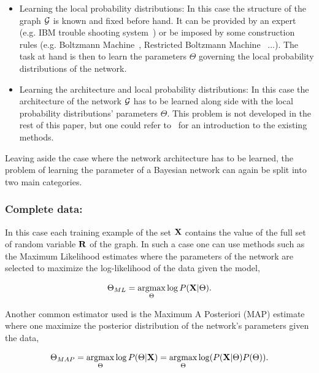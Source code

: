\documentclass[a4paper,11pt]{report}
\begin{document}
      \begin{itemize}
				\item Learning the local probability distributions: In this case the structure of the graph $\mathcal{G}$ is known and fixed before hand. It can be provided by an expert (e.g. IBM trouble shooting system~\citep{rish2002efficient}) or be imposed by some construction rules (e.g. Boltzmann Machine~\citep{ackley1985learning}, Restricted Boltzmann Machine~\citep{smolensky1986information} ...). The task at hand is then to learn the parameters $\Theta$ governing the local probability distributions of the network.\\
				
        \item Learning the architecture and local probability distributions: In this case the architecture of the network $\mathcal{G}$ has to be learned along side with the local probability distributions' parameters $\Theta$. This problem is not developed in the rest of this paper, but one could refer to~\citep{margaritis2003learning} for an introduction to the existing methods.\\
      \end{itemize}
      
      Leaving aside the case where the network architecture has to be learned, the problem of learning the parameter of a Bayesian network can again be split into two main categories. 
      
      \subsubsection{Complete data:}

				In this case each training example of the set ${\bf X}$ contains the value of the full set of random variable ${\bf R}$ of the graph. In such a case one can use methods such as the Maximum Likelihood estimates where the parameters of the network are selected to maximize the log-likelihood of the data given the model,
				
      \begin{equation}
        \Theta_{ML} = \mathop{\rm argmax}_{\Theta} \log P({\bf X} | \Theta).
        \label{eq:BN ML}
      \end{equation}
      
      Another common estimator used is the Maximum A Posteriori (MAP) estimate where one maximize the posterior distribution of the network's parameters given the data,
      
      \begin{equation}
        \Theta_{MAP} = \mathop{\rm argmax}_{\Theta} \log P(\Theta | {\bf X}) = \mathop{\rm argmax}_{\Theta} \log (P({\bf X} | \Theta)P(\Theta)). 
        \label{eq:BN MAP}
      \end{equation}    
      
\end{document}

